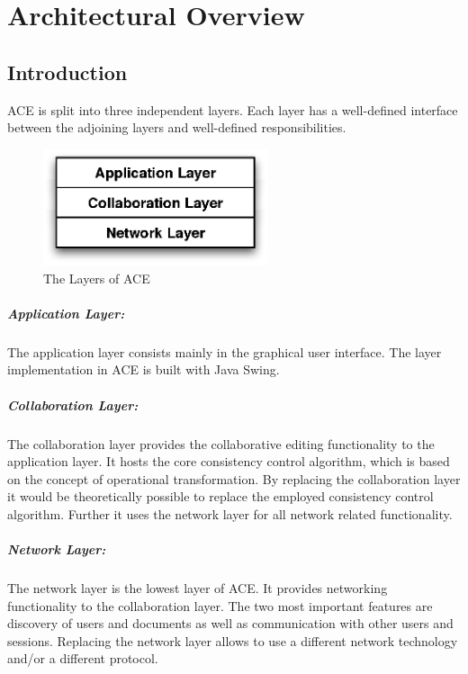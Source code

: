 \chapter{Architectural Overview}


\section{Introduction}
ACE is split into three independent layers. Each layer has a well-defined 
interface between the adjoining layers and well-defined responsibilities. 

\begin{figure}[H]
 \centering
 \includegraphics[width=6.6cm,height=3.42cm]{../images/layers.eps}
 \caption{The Layers of ACE}
\end{figure}

\paragraph{Application Layer:} The application layer consists mainly in the 
graphical user interface. The layer implementation in ACE is built with
Java Swing.

\paragraph{Collaboration Layer:} The collaboration layer provides the
collaborative editing functionality to the application layer. It hosts the core
consistency control algorithm, which is based on the concept of operational 
transformation. By replacing the collaboration layer it would be theoretically 
possible to replace the employed consistency control algorithm. Further it uses 
the network layer for all network related functionality.

\paragraph{Network Layer:} The network layer is the lowest layer of ACE. It 
provides networking functionality to the collaboration layer. The two most 
important features are discovery of users and documents as well as communication 
with other users and sessions. Replacing the network layer allows to use a 
different network technology and/or a different protocol.



